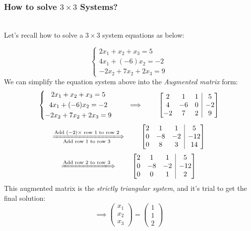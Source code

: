 \newpage
\subsubsection{How to solve $3 \times 3$ Systems?}

\begin{example} \qquad
\\
Let's recall how to solve a $3 \times 3$ system equations as below:

\[
\left \{	\begin{gathered}
2x_1 + x_2 +x_3=5 	\\
4x_1 + (-6)x_2 = -2 \\
-2x_2+7x_2+2x_3 = 9
\end{gathered}	\right.
\]
We can simplify the equation system above into the \emph{Augmented matrix} form:
\[
\left \{	\begin{gathered}
2x_1 + x_2 +x_3=5 	\\
4x_1 + (-6)x_2 = -2 \\
-2x_2+7x_2+2x_3 = 9
\end{gathered}	\right.
\qquad \implies \qquad
\left[
\begin{array}{@{}ccc|c@{}}
2 & 1 & 1 & 5\\
4 & -6 & 0 & -2\\
-2 & 7 & 2 & 9
\end{array}
\right]
\]
%
\[
\xLongrightarrow[\text{Add row 1 to row 3}]{\text{Add $(-2)\times$ row 1 to row 2}}{\quad\quad}
\left[
\begin{array}{@{}ccc|c@{}}
2 & 1 & 1 & 5\\
0 & -8 & -2 & -12\\
0 & 8 & 3 & 14
\end{array}
\right]
\]
\[\xLongrightarrow{\text{Add row 2 to row 3}}{\quad\quad}
\left[
\begin{array}{@{}ccc|c@{}}
2 & 1 & 1 & 5\\
0 & -8 & -2 & -12\\
0 & 0 & 1 & 2
\end{array}
\right]\]
This augmented matrix is the \emph{strictly triangular system}, and it's trial to get the final solution:
\[\implies
\begin{pmatrix}
x_1\\x_2\\x_3
\end{pmatrix}=
\begin{pmatrix}
1\\1\\2
\end{pmatrix}\]
\end{example}
